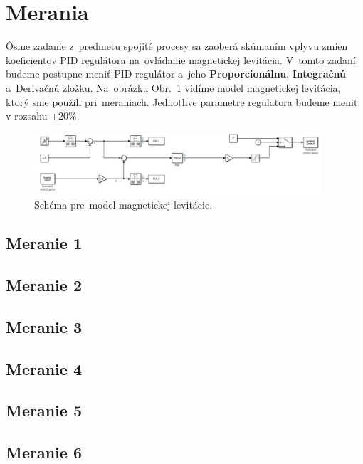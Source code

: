 \documentclass{article}
\begin{document}
\clearpage

\section{Merania}
\label{sec:merania}

Ôsme zadanie z~predmetu spojité procesy sa zaoberá skúmaním vplyvu zmien koeficientov PID regulátora
na~ovládanie magnetickej levitácia. V~tomto zadaní budeme postupne meniť PID regulátor a~jeho \textbf{Proporcionálnu},
\textbf{Integračnú} a~Derivačnú zložku. Na~obrázku Obr.~\ref{fig:schema} vidíme model magnetickej levitácia,
ktorý sme použili pri~meraniach. Jednotlive parametre regulatora budeme menit v rozsahu $\pm20\%$.

\begin{figure}[!htbp]
	\begin{center}
		\includegraphics[width=0.95\textwidth]{include/schema.png}
	\end{center}
	\caption{Schéma pre~model magnetickej levitácie.}
	\label{fig:schema}
\end{figure}

\subsection{Meranie 1}
\label{sec:meranie1}



\subsection{Meranie 2}
\label{sec:meranie2}

\subsection{Meranie 3}
\label{sec:meranie3}

\subsection{Meranie 4}
\label{sec:meranie4}

\subsection{Meranie 5}
\label{sec:meranie5}

\subsection{Meranie 6}
\label{sec:meranie6}
\end{document}
